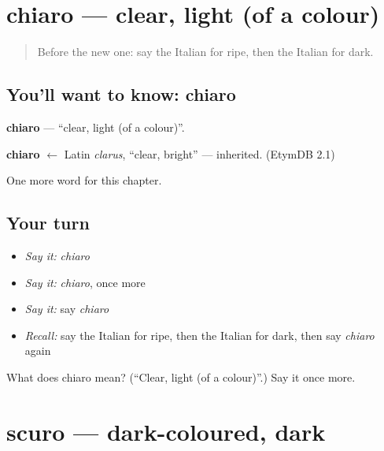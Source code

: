 \section[chiaro]{chiaro — clear, light (of a colour)}

\label{lesson:IT-C158-chiaro}



\begin{quote}
Before the new one: say the Italian for ripe, then the Italian for dark.
\end{quote}

\subsection*{You'll want to know: chiaro}
\textbf{chiaro} — \textquotedblleft{}clear, light (of a colour)\textquotedblright{}.

\begin{cousinweb}
\textbf{chiaro} $\leftarrow$ Latin \emph{clarus}, \textquotedblleft{}clear, bright\textquotedblright{} — inherited. (EtymDB 2.1)
\end{cousinweb}

\begin{grammarlens}[title={What you've built}]
One more word for this chapter.
\end{grammarlens}

\subsection*{Your turn}
\begin{itemize}
\raggedright
  \item \emph{Say it:} \emph{chiaro}
  \item \emph{Say it:} \emph{chiaro}, once more
  \item \emph{Say it:} say \emph{chiaro}
  \item \emph{Recall:} say the Italian for ripe, then the Italian for dark, then say \emph{chiaro} again
\end{itemize}

\begin{tcolorbox}[breakable,colback=teal!4,colframe=teal!35!black,title={Before you move on}]
What does chiaro mean? (\textquotedblleft{}Clear, light (of a colour)\textquotedblright{}.) Say it once more.
\end{tcolorbox}
\section[scuro]{scuro — dark-coloured, dark}

